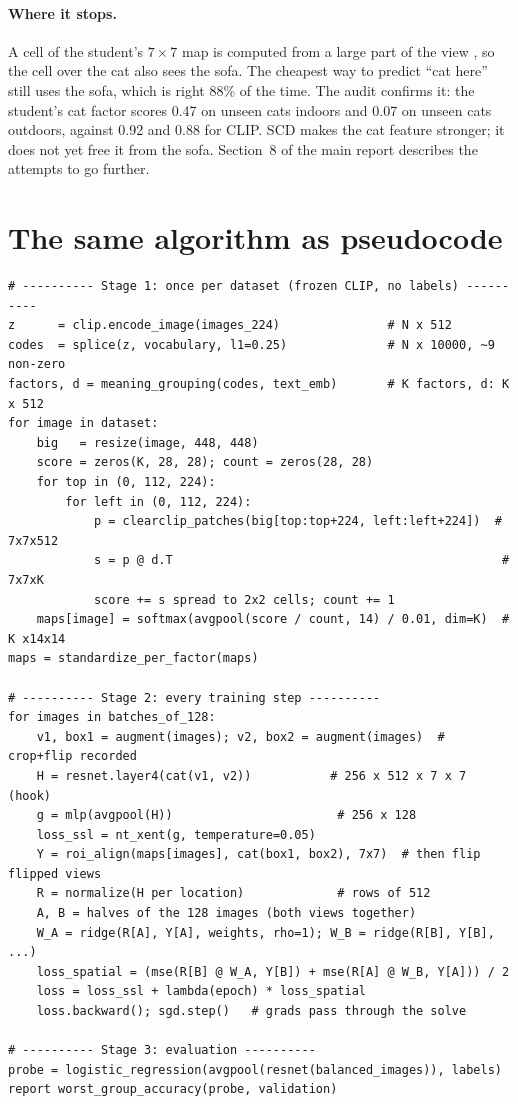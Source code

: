 \documentclass[11pt]{article}
\begin{document}
\paragraph{Where it stops.} A cell of the student's $7\times7$ map is computed from a large part of the view
\citep{luo2016erf}, so the cell over the cat also sees the sofa. The cheapest way to predict ``cat here'' still uses the
sofa, which is right 88\% of the time. The audit confirms it: the student's cat factor scores 0.47 on unseen cats indoors
and 0.07 on unseen cats outdoors, against 0.92 and 0.88 for CLIP. SCD makes the cat feature stronger; it does not yet
free it from the sofa. Section~8 of the main report describes the attempts to go further.

\section{The same algorithm as pseudocode}
\begin{verbatim}
# ---------- Stage 1: once per dataset (frozen CLIP, no labels) ----------
z      = clip.encode_image(images_224)               # N x 512
codes  = splice(z, vocabulary, l1=0.25)              # N x 10000, ~9 non-zero
factors, d = meaning_grouping(codes, text_emb)       # K factors, d: K x 512
for image in dataset:
    big   = resize(image, 448, 448)
    score = zeros(K, 28, 28); count = zeros(28, 28)
    for top in (0, 112, 224):
        for left in (0, 112, 224):
            p = clearclip_patches(big[top:top+224, left:left+224])  # 7x7x512
            s = p @ d.T                                              # 7x7xK
            score += s spread to 2x2 cells; count += 1
    maps[image] = softmax(avgpool(score / count, 14) / 0.01, dim=K)  # K x14x14
maps = standardize_per_factor(maps)

# ---------- Stage 2: every training step ----------
for images in batches_of_128:
    v1, box1 = augment(images); v2, box2 = augment(images)  # crop+flip recorded
    H = resnet.layer4(cat(v1, v2))           # 256 x 512 x 7 x 7  (hook)
    g = mlp(avgpool(H))                       # 256 x 128
    loss_ssl = nt_xent(g, temperature=0.05)
    Y = roi_align(maps[images], cat(box1, box2), 7x7)  # then flip flipped views
    R = normalize(H per location)             # rows of 512
    A, B = halves of the 128 images (both views together)
    W_A = ridge(R[A], Y[A], weights, rho=1); W_B = ridge(R[B], Y[B], ...)
    loss_spatial = (mse(R[B] @ W_A, Y[B]) + mse(R[A] @ W_B, Y[A])) / 2
    loss = loss_ssl + lambda(epoch) * loss_spatial
    loss.backward(); sgd.step()   # grads pass through the solve

# ---------- Stage 3: evaluation ----------
probe = logistic_regression(avgpool(resnet(balanced_images)), labels)
report worst_group_accuracy(probe, validation)
\end{verbatim}
\end{document}
